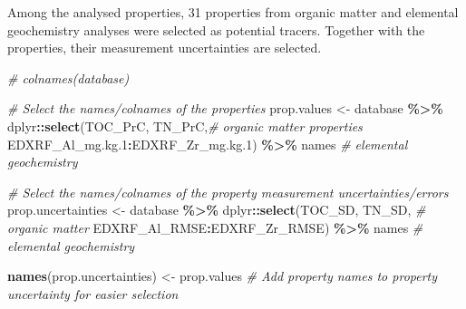 \documentclass[
]{article}
\newenvironment{Shaded}{\begin{snugshade}}{\end{snugshade}}
\newcommand{\CommentTok}[1]{\textcolor[rgb]{0.56,0.35,0.01}{\textit{#1}}}
\newcommand{\FloatTok}[1]{\textcolor[rgb]{0.00,0.00,0.81}{#1}}
\newcommand{\FunctionTok}[1]{\textcolor[rgb]{0.13,0.29,0.53}{\textbf{#1}}}
\newcommand{\NormalTok}[1]{#1}
\newcommand{\OtherTok}[1]{\textcolor[rgb]{0.56,0.35,0.01}{#1}}
\newcommand{\SpecialCharTok}[1]{\textcolor[rgb]{0.81,0.36,0.00}{\textbf{#1}}}
\begin{document}
Among the analysed properties, 31 properties from organic matter and
elemental geochemistry analyses were selected as potential tracers.
Together with the properties, their measurement uncertainties are
selected.

\begin{Shaded}
\begin{Highlighting}[]
\CommentTok{\# colnames(database)}

\CommentTok{\# Select the names/colnames of the properties}
\NormalTok{prop.values }\OtherTok{\textless{}{-}}\NormalTok{ database }\SpecialCharTok{\%\textgreater{}\%}\NormalTok{ dplyr}\SpecialCharTok{::}\FunctionTok{select}\NormalTok{(TOC\_PrC, TN\_PrC,}\CommentTok{\# organic matter properties}
\NormalTok{                                          EDXRF\_Al\_mg.kg}\FloatTok{.1}\SpecialCharTok{:}\NormalTok{EDXRF\_Zr\_mg.kg}\FloatTok{.1}\NormalTok{) }\SpecialCharTok{\%\textgreater{}\%}\NormalTok{ names }\CommentTok{\# elemental geochemistry}


\CommentTok{\# Select the names/colnames of the property measurement uncertainties/errors}
\NormalTok{prop.uncertainties }\OtherTok{\textless{}{-}}\NormalTok{ database }\SpecialCharTok{\%\textgreater{}\%}\NormalTok{ dplyr}\SpecialCharTok{::}\FunctionTok{select}\NormalTok{(TOC\_SD, TN\_SD, }\CommentTok{\# organic matter}
\NormalTok{                                                 EDXRF\_Al\_RMSE}\SpecialCharTok{:}\NormalTok{EDXRF\_Zr\_RMSE) }\SpecialCharTok{\%\textgreater{}\%}\NormalTok{ names }\CommentTok{\# elemental geochemistry}

\FunctionTok{names}\NormalTok{(prop.uncertainties) }\OtherTok{\textless{}{-}}\NormalTok{ prop.values }\CommentTok{\# Add property names to property uncertainty for easier selection}
\end{Highlighting}
\end{Shaded}
\end{document}
